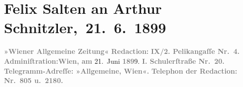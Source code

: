 

         
         \renewcommand{\erwaehntePersonen}{Personen: Paul Goldmann, Georg Hirschfeld, Hugo von Hofmannsthal, Felix Salten, Gustav Schwarzkopf, Julius Szeps}
         \renewcommand{\erwaehnteInstitutionen}{Institutionen: Burgtheater, Wiener Allgemeine Zeitung}
         \renewcommand{\erwaehnteOrte}{Orte: Berlin, Budapest, Pelikangasse, Schulerstraße, Slawonien, Wien}
         \renewcommand{\erwaehnteWerke}{Werke: ?? [Feuilleton über Paul Goldmann], Reigen. Zehn Dialoge, Scene aus der »Hochzeit der Sobeide«. (Ältere Niederschrift. Wien 1897. — Ungedruckt.), Wiener Allgemeine Montags-Zeitung, Wiener Allgemeine Rundschau}
               \section[ Felix Salten an Arthur Schnitzler, 21. 6. 1899]{ Felix Salten an Arthur Schnitzler, 21. 6. 1899}\nopagebreak{}\rehead{ }\begin{ledgroupsized}[t]{13cm}\normalsize\beginnumbering{} \toendnotes[C]{\smallbreak\pagebreak[2]} 
\toendnotes[C]{\smallbreak}\pstart
           \noindent{}{\pb}\textcolor{gray}{\textbf{\textbf{»Wiener Allgemeine
                        Zeitung«}}}\pend
           \pstart
           \textcolor{gray}{\textbf{Redaction:}}\pend
           \pstart
           \textcolor{gray}{\textbf{IX/2. \textbf{Pelikangaſſe
                        Nr.} 4. }}\pend
           \pstart
           \textcolor{gray}{\textbf{Adminiſtration:}}\hfill \textcolor{gray}{\textbf{Wien, am}}{ }21. Juni \textcolor{gray}{\textbf{189}}9.\pend
           \pstart
           \textcolor{gray}{\textbf{I. \textbf{Schulerſtraße
                        Nr.} 20. }}\pend
           \pstart
           \textcolor{gray}{\textbf{Telegramm-Adreſſe: »Allgemeine, Wien«.}}\pend
           \pstart
           \textcolor{gray}{\textbf{Telephon der Redaction: Nr. 805 u. 2180.}}\pend

\end{ledgroupsized}

